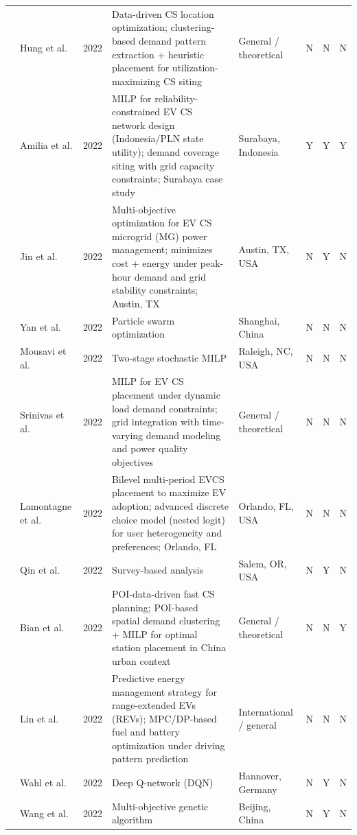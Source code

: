 \documentclass[letterpaper, 12pt, oneside, doublespacing]{Thesis}
\begin{document}
\begin{longtable}{L{0.9cm} L{1.8cm} L{0.7cm} L{2.5cm} L{2.1cm} L{0.7cm} L{0.7cm} L{0.7cm}}
\cite{a_novel_2022} & Hung et al. & 2022 & Data-driven CS location optimization; clustering-based demand pattern extraction + heuristic placement for utilization-maximizing CS siting & General {\slash} theoretical & N & N & N \\
\cite{designing_an_2022} & Amilia et al. & 2022 & MILP for reliability-constrained EV CS network design (Indonesia/PLN state utility); demand coverage siting with grid capacity constraints; Surabaya case study & Surabaya, Indonesia & Y & Y & Y \\
\cite{development_of_2022} & Jin et al. & 2022 & Multi-objective optimization for EV CS microgrid (MG) power management; minimizes cost + energy under peak-hour demand and grid stability constraints; Austin, TX & Austin, TX, USA & N & Y & N \\
\cite{distributed_coordination_2022} & Yan et al. & 2022 & Particle swarm optimization & Shanghai, China & N & N & N \\
\cite{ev_charging_2022} & Mousavi et al. & 2022 & Two-stage stochastic MILP & Raleigh, NC, USA & N & N & N \\
\cite{optimal_placement_2022} & Srinivas et al. & 2022 & MILP for EV CS placement under dynamic load demand constraints; grid integration with time-varying demand modeling and power quality objectives & General {\slash} theoretical & N & N & N \\
\cite{optimising_electric_2022} & Lamontagne et al. & 2022 & Bilevel multi-period EVCS placement to maximize EV adoption; advanced discrete choice model (nested logit) for user heterogeneity and preferences; Orlando, FL & Orlando, FL, USA & N & N & N \\
\cite{performance_analysis_2022} & Qin et al. & 2022 & Survey-based analysis & Salem, OR, USA & N & Y & N \\
\cite{planning_of_2022} & Bian et al. & 2022 & POI-data-driven fast CS planning; POI-based spatial demand clustering + MILP for optimal station placement in China urban context & General {\slash} theoretical & N & N & Y \\
\cite{predictive_energy_2022} & Lin et al. & 2022 & Predictive energy management strategy for range-extended EVs (REVs); MPC/DP-based fuel and battery optimization under driving pattern prediction & International {\slash} general & N & N & N \\
\cite{reinforcement_learning-based_2022} & Wahl et al. & 2022 & Deep Q-network (DQN) & Hannover, Germany & N & Y & N \\
\cite{research_on_2022} & Wang et al. & 2022 & Multi-objective genetic algorithm & Beijing, China & N & Y & N \\

\end{longtable}
\end{document}

